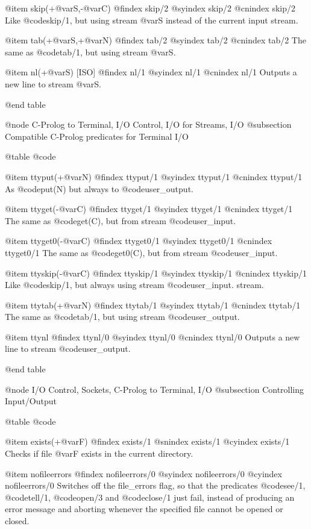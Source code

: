 {{{{{{@item skip(+@var{S},-@var{C})
@findex skip/2
@syindex skip/2
@cnindex skip/2
Like @code{skip/1}, but using stream @var{S} instead of the current
input stream.

@item tab(+@var{S},+@var{N})
@findex tab/2
@syindex tab/2
@cnindex tab/2
The same as @code{tab/1}, but using stream @var{S}.

@item nl(+@var{S}) [ISO]
@findex nl/1
@syindex nl/1
@cnindex nl/1
Outputs a new line to stream @var{S}.

@end table

@node C-Prolog to Terminal, I/O Control, I/O for Streams, I/O
@subsection Compatible C-Prolog predicates for Terminal I/O

@table @code

@item ttyput(+@var{N})
@findex ttyput/1
@syindex ttyput/1
@cnindex ttyput/1
As @code{put(N)} but always to @code{user_output}.

@item ttyget(-@var{C})
@findex ttyget/1
@syindex ttyget/1
@cnindex ttyget/1
The same as @code{get(C)}, but from stream @code{user_input}.

@item ttyget0(-@var{C})
@findex ttyget0/1
@syindex ttyget0/1
@cnindex ttyget0/1
The same as @code{get0(C)}, but from stream @code{user_input}.

@item ttyskip(-@var{C})
@findex ttyskip/1
@syindex ttyskip/1
@cnindex ttyskip/1
Like @code{skip/1}, but always using stream @code{user_input}.
stream.

@item ttytab(+@var{N})
@findex ttytab/1
@syindex ttytab/1
@cnindex ttytab/1
The same as @code{tab/1}, but using stream @code{user_output}.

@item ttynl
@findex ttynl/0
@syindex ttynl/0
@cnindex ttynl/0
Outputs a new line to stream @code{user_output}.

@end table

@node I/O Control, Sockets, C-Prolog to Terminal, I/O
@subsection Controlling Input/Output

@table @code

@item exists(+@var{F})
@findex exists/1
@snindex exists/1
@cyindex exists/1
Checks if file @var{F} exists in the current directory.

@item nofileerrors
@findex nofileerrors/0
@syindex nofileerrors/0
@cyindex nofileerrors/0
Switches off the file_errors flag, so that the predicates @code{see/1},
@code{tell/1}, @code{open/3} and @code{close/1} just fail, instead of producing
an error message and aborting whenever the specified file cannot be
opened or closed.

}}}}}}
